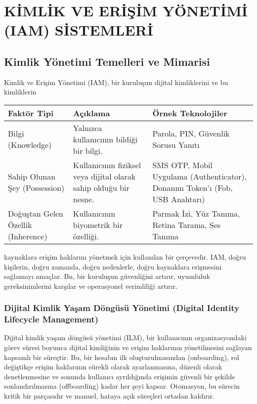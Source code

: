 \chapter{KİMLİK VE ERİŞİM YÖNETİMİ (IAM) SİSTEMLERİ}

\section{Kimlik Yönetimi Temelleri ve Mimarisi}
Kimlik ve Erişim Yönetimi (IAM), bir kuruluşun dijital kimliklerini ve bu kimliklerin

\begin{tabularx}{\textwidth}{|l|X|X|}
\hline
\textbf{Faktör Tipi} & \textbf{Açıklama} & \textbf{Örnek Teknolojiler} \\
\hline
Bilgi (Knowledge) & Yalnızca kullanıcının bildiği bir bilgi. & Parola, PIN, Güvenlik Sorusu Yanıtı \\
\hline
Sahip Olunan Şey (Possession) & Kullanıcının fiziksel veya dijital olarak sahip olduğu bir nesne. & SMS OTP, Mobil Uygulama (Authenticator), Donanım Token'ı (Fob, USB Anahtarı) \\
\hline
Doğuştan Gelen Özellik (Inherence) & Kullanıcının biyometrik bir özelliği. & Parmak İzi, Yüz Tanıma, Retina Tarama, Ses Tanıma \\
\hline
\end{tabularx}

kaynaklara erişim haklarını yönetmek için kullanılan bir çerçevedir. IAM, doğru kişilerin, doğru zamanda, doğru nedenlerle, doğru kaynaklara erişmesini sağlamayı amaçlar. Bu, bir kuruluşun güvenliğini artırır, uyumluluk gereksinimlerini karşılar ve operasyonel verimliliği artırır.

\subsection{Dijital Kimlik Yaşam Döngüsü Yönetimi (Digital Identity Lifecycle Management)}

Dijital kimlik yaşam döngüsü yönetimi (ILM), bir kullanıcının organizasyondaki görev süresi boyunca dijital kimliğinin ve erişim haklarının yönetilmesini sağlayan kapsamlı bir süreçtir. Bu, bir hesabın ilk oluşturulmasından (onboarding), rol değiştikçe erişim haklarının sürekli olarak ayarlanmasına, düzenli olarak denetlenmesine ve sonunda kullanıcı ayrıldığında erişimin güvenli bir şekilde sonlandırılmasına (offboarding) kadar her şeyi kapsar. Otomasyon, bu sürecin kritik bir parçasıdır ve manuel, hataya açık süreçleri ortadan kaldırır.

